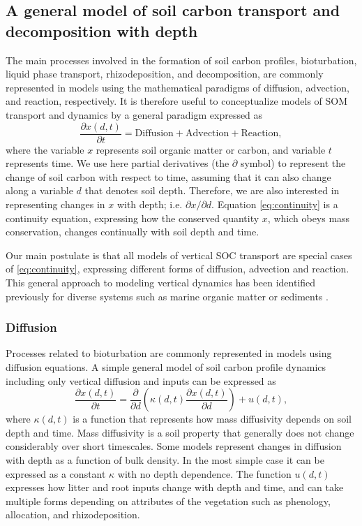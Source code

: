 \documentclass[11pt, oneside, a4paper]{article}   	%
\providecommand{\DIFaddtex}[1]{{\protect\color{blue}\uwave{#1}}} %
\providecommand{\DIFaddbegin}{} %
\providecommand{\DIFaddend}{} %
\providecommand{\DIFadd}[1]{\texorpdfstring{\DIFaddtex{#1}}{#1}} %
\newcommand{\DIFaddincludegraphics}[2][]{{\color{blue}\fbox{\DIFOincludegraphics[#1]{#2}}}} %
\DeclareRobustCommand{\DIFaddbegin}{\DIFOaddbegin \let\includegraphics\DIFaddincludegraphics} %
\DeclareRobustCommand{\DIFaddend}{\DIFOaddend \let\includegraphics\DIFOincludegraphics} %
\begin{document}
\subsection{A general model of soil carbon transport and decomposition with depth}
The main processes involved in the formation of soil carbon profiles, bioturbation, liquid phase transport, rhizodeposition, and decomposition, are commonly represented in models using the mathematical paradigms of diffusion, advection, and reaction, respectively.
It is therefore useful to conceptualize models of SOM transport and dynamics by a general paradigm expressed as
\begin{equation} \label{eq:continuity}
\frac{\partial x(d, t)}{\partial t} = \mathrm{Diffusion} + \mathrm{Advection} + \mathrm{Reaction},
\end{equation}
where the variable $x$ represents soil organic matter or carbon, and variable $t$ represents time. We use here partial derivatives (the $\partial$ symbol) to represent the change of soil carbon with respect to time, assuming that it can also change along a variable $d$ that denotes soil depth. Therefore, we are also interested in representing changes in $x$ with depth; i.e. $\partial x/\partial d$. Equation \ref{eq:continuity} is a continuity equation, expressing how the conserved quantity $x$, which obeys mass conservation, changes continually with soil depth and time. 

Our main postulate is that all models of vertical SOC transport are special cases of \ref{eq:continuity}, expressing different forms of diffusion, advection and reaction. This general approach to modeling vertical dynamics has been identified previously for diverse systems such as marine organic matter \citep{Sarmiento2006} or sediments \citep{Arndt2013}.

\subsubsection{Diffusion}
Processes related to bioturbation \DIFaddbegin \DIFadd{and tillage }\DIFaddend are commonly represented in models using diffusion equations. 
A simple general model of soil carbon profile dynamics including only vertical diffusion and inputs can be expressed as
\begin{equation} \label{eq:diffusion}
\frac{\partial x(d,t)}{\partial t} = \frac{\partial}{\partial d} \left( \kappa(d, t) \frac{\partial x(d, t)}{\partial d} \right) + u (d, t),
\end{equation}
where $\kappa(d, t)$ is a function that represents how mass diffusivity depends on soil depth and time. Mass diffusivity is a soil property that generally does not change considerably over short timescales. Some models represent changes in diffusion with depth as a function of bulk density. In the most simple case it can be expressed as a constant $\kappa$ with no depth dependence. The function $u(d, t)$ expresses how litter and root inputs change with depth and time, and can take multiple forms depending on attributes of the vegetation such as phenology, allocation, and rhizodeposition. 
\end{document}
